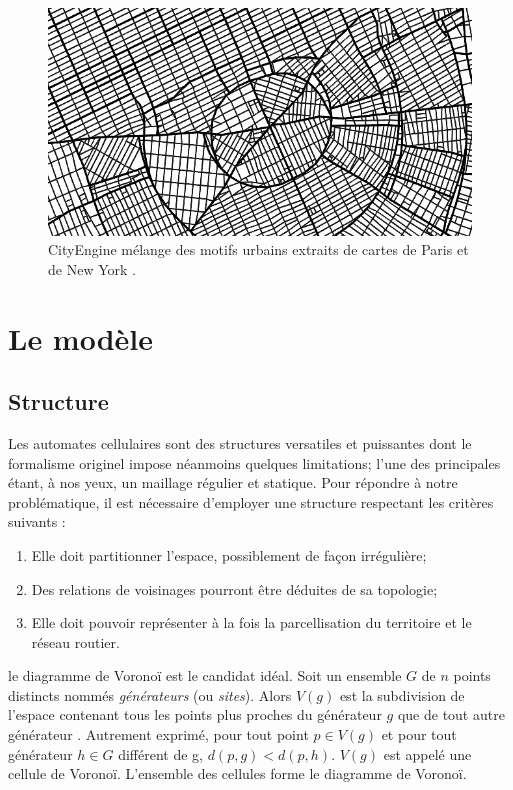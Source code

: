 \documentclass[10pt]{article}
\begin{document}
\begin{figure}[H]
  \centering
  \includegraphics[width=.8\linewidth]{images/cityengine.png}
  \caption{CityEngine mélange des motifs urbains extraits de cartes de
    Paris et de New York \cite{Parish2001}.}
  \label{fig:cityengine}
\end{figure}

\section{Le modèle}

\subsection{Structure}

Les automates cellulaires sont des structures versatiles et puissantes
dont le formalisme originel impose néanmoins quelques limitations;
l'une des principales étant, à nos yeux, un maillage régulier et
statique. Pour répondre à notre problématique, il est nécessaire
d'employer une structure respectant les critères suivants :

\begin{enumerate}
\item{Elle doit partitionner l'espace, possiblement de façon
  irrégulière;}
\item{Des relations de voisinages pourront être déduites de sa
  topologie;}
\item{Elle doit pouvoir représenter à la fois la parcellisation du
  territoire et le réseau routier.}
\end{enumerate}

le diagramme de Voronoï est le candidat idéal. Soit un ensemble $G$ de
$n$ points distincts nommés \textit{générateurs} (ou
\textit{sites}). Alors $V(g)$ est la subdivision de l'espace contenant
tous les points plus proches du générateur $g$ que de tout autre
générateur \cite{Edwards1993}. Autrement exprimé, pour tout point $p
\in V(g)$ et pour tout générateur $h \in G$ différent de g, $d(p,g) <
d(p,h)$. $V(g)$ est appelé une cellule de Voronoï. L'ensemble des
cellules forme le diagramme de Voronoï.
\end{document}
